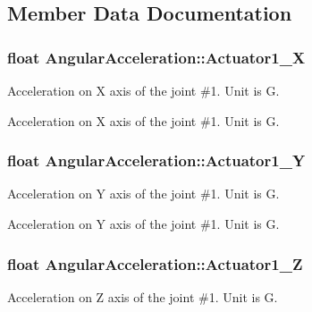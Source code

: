 \subsection{Member Data Documentation}
\subsubsection[{\texorpdfstring{Actuator1\+\_\+X}{Actuator1_X}}]{\setlength{\rightskip}{0pt plus 5cm}float Angular\+Acceleration\+::\+Actuator1\+\_\+X}\hypertarget{structAngularAcceleration_a5cfc56b69d136bce62b14f2828db3850}{}\label{structAngularAcceleration_a5cfc56b69d136bce62b14f2828db3850}


Acceleration on X axis of the joint \#1. Unit is G. 

Acceleration on X axis of the joint \#1. Unit is G. 
\subsubsection[{\texorpdfstring{Actuator1\+\_\+Y}{Actuator1_Y}}]{\setlength{\rightskip}{0pt plus 5cm}float Angular\+Acceleration\+::\+Actuator1\+\_\+Y}\hypertarget{structAngularAcceleration_ae7137ba81e19e031606c67f9f675ebf4}{}\label{structAngularAcceleration_ae7137ba81e19e031606c67f9f675ebf4}


Acceleration on Y axis of the joint \#1. Unit is G. 

Acceleration on Y axis of the joint \#1. Unit is G. 
\subsubsection[{\texorpdfstring{Actuator1\+\_\+Z}{Actuator1_Z}}]{\setlength{\rightskip}{0pt plus 5cm}float Angular\+Acceleration\+::\+Actuator1\+\_\+Z}\hypertarget{structAngularAcceleration_aae297625ad8f8f25a8e6ff44331ad369}{}\label{structAngularAcceleration_aae297625ad8f8f25a8e6ff44331ad369}


Acceleration on Z axis of the joint \#1. Unit is G. 

